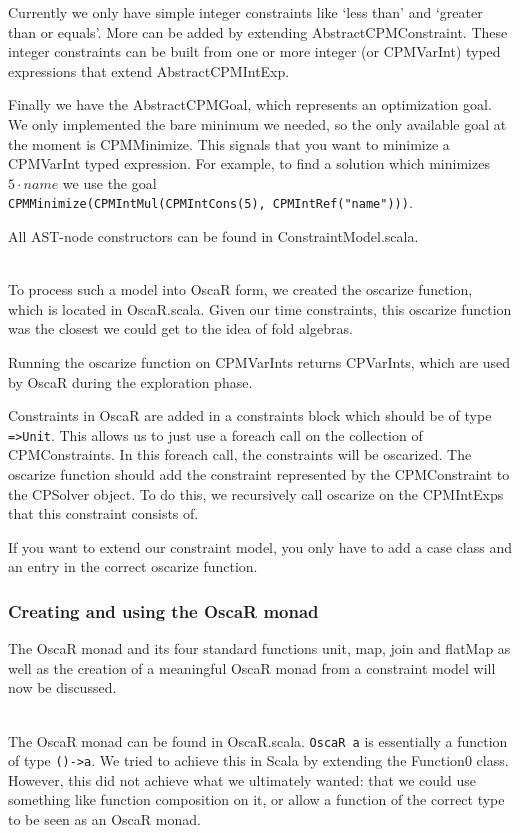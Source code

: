 \documentclass[a4paper]{article}
\begin{document}
Currently we only have simple integer constraints
like `less than' and `greater than or equals'.
More can be added by extending AbstractCPMConstraint.
These integer constraints can be built from one or more integer 
(or CPMVarInt) typed expressions that extend AbstractCPMIntExp.

Finally we have the AbstractCPMGoal, 
which represents an optimization goal.
We only implemented the bare minimum we needed,
so the only available goal at the moment is CPMMinimize.
This signals that you want to minimize a CPMVarInt typed
expression.
For example, to find a solution which minimizes $5\cdot name$ we use the goal
\\\verb|CPMMinimize(CPMIntMul(CPMIntCons(5), CPMIntRef("name")))|.

All AST-node constructors can be found in ConstraintModel.scala.

\hspace*{1em}\\
To process such a model into OscaR form, 
we created the oscarize function, which is located in OscaR.scala.
Given our time constraints, 
this oscarize function was the closest we could get to the idea of fold algebras.

Running the oscarize function on CPMVarInts returns CPVarInts,
which are used by OscaR during the exploration phase.

Constraints in OscaR are added in a constraints block which should be of type
\verb|=>Unit|.
This allows us to just use a foreach call on the collection of CPMConstraints.
In this foreach call, the constraints will be oscarized.
The oscarize function should add the constraint represented by the CPMConstraint
to the CPSolver object.
To do this, we recursively call oscarize on the CPMIntExps
that this constraint consists of.

If you want to extend our constraint model,
you only have to add a case class and an entry in the correct oscarize function.


\subsubsection{Creating and using the OscaR monad}
The OscaR monad and its four standard functions unit, map, join and flatMap as well as
the creation of a meaningful OscaR monad from a constraint model will now
be discussed.

\hspace*{1em}\\
The OscaR monad can be found in OscaR.scala.
\verb|OscaR a| is essentially a function of type \verb|()->a|.
We tried to achieve this in Scala by extending the Function0 class.
However, this did not achieve what we ultimately wanted: 
that we could use something like function composition on it,
or allow a function of the correct type to be seen as an OscaR monad.
\end{document}
